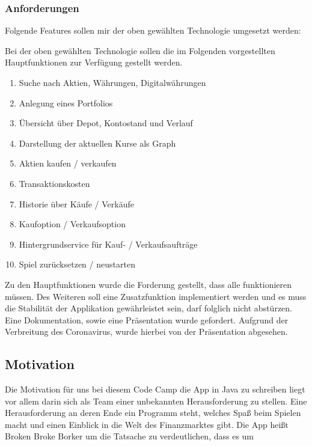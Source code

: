 \documentclass[10pt]{scrartcl}
\begin{document}
\subsubsection{Anforderungen}
Folgende Features sollen mir  der oben gewählten Technologie umgesetzt werden:

Bei der oben gewählten Technologie sollen die im Folgenden vorgestellten Hauptfunktionen zur Verfügung gestellt werden.

\begin{enumerate}
	\item 
	Suche nach Aktien, Währungen, Digitalwährungen
	\item
	Anlegung eines Portfolios
	\item
	Übersicht über Depot, Kontostand und Verlauf
	\item
	Darstellung der aktuellen Kurse als Graph
	\item
	Aktien kaufen / verkaufen
	\item
	Transaktionskosten
	\item
	Historie über Käufe / Verkäufe
	\item
	Kaufoption / Verkaufsoption
	\item
	Hintergrundservice für Kauf- / Verkaufsaufträge
	\item
	Spiel zurücksetzen / neustarten
\end{enumerate}


Zu den Hauptfunktionen wurde die Forderung gestellt, dass alle funktionieren müssen. Des Weiteren soll eine Zusatzfunktion implementiert werden und es muss die Stabilität der Applikation gewährleistet sein, darf folglich nicht abstürzen. Eine Dokumentation, sowie eine Präsentation wurde gefordert. Aufgrund der Verbreitung des Coronavirus, wurde hierbei von der Präsentation abgesehen.



\subsection{Motivation}
Die Motivation für uns bei diesem Code Camp die App in Java zu schreiben liegt vor allem darin sich als Team einer unbekannten Herausforderung zu stellen. Eine Herausforderung an deren Ende ein Programm steht, welches Spaß beim Spielen macht und einen Einblick in die Welt des Finanzmarktes gibt. Die App heißt Broken Broke Borker um die Tatsache zu verdeutlichen, dass es um 
\end{document}
